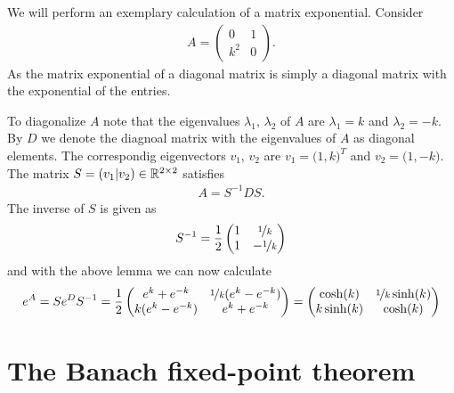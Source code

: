 \begin{example}
	We will perform an exemplary calculation of a matrix exponential. Consider
	\begin{gather*}
		A = \begin{pmatrix} 0 & 1 \\ k^2 & 0 \end{pmatrix}.
	\end{gather*}
	As the matrix exponential of a diagonal matrix is simply a diagonal matrix 
	with the exponential of the entries.
	
	To diagonalize $A$ note that the eigenvalues $\lambda_1, \, \lambda_2$ of
	$A$ are $\lambda_1 = k$ and $\lambda_2 = -k$. By $D$ we denote the diagnoal
	matrix with the eigenvalues of $A$ as diagonal elements. The correspondig
	eigenvectors $v_1, \, v_2$ are $v_1 = \big( 1, k \big)^T$ and
	$v_2 = \big(1, -k \big)$. The matrix $S = (v_1 | v_2) \in \mathbb R^{2\times 2}$
	satisfies
	\begin{gather*}
		A = S^{-1} D S.
	\end{gather*}
	The inverse of $S$ is given as	
	\begin{gather*}
		S^{-1} = \frac 12
			\begin{pmatrix}
				1 & \nicefrac 1k \\
				1 & - \nicefrac 1k
			\end{pmatrix}
	\end{gather*}
	and with the above lemma we can now calculate
	\begin{gather*}
	e^A = S e^D S^{-1} = \frac 12
			\begin{pmatrix}
				e^k + e^{-k} & \nicefrac 1k (e^k - e^{-k}) \\
				k (e^k - e^{-k}) & e^k + e^{-k}
			\end{pmatrix}
			=
			\begin{pmatrix}
				\cosh(k) & \nicefrac 1k \sinh(k) \\
				k \sinh(k) & \cosh(k)
			\end{pmatrix}
	\end{gather*}
\end{example}


\section{The Banach fixed-point theorem}

